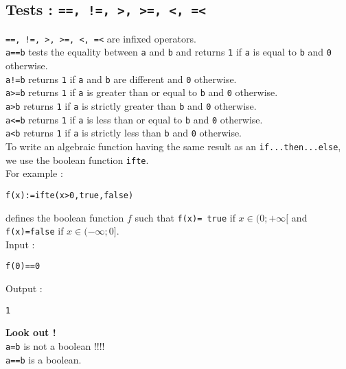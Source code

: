 \documentclass[a4paper,11pt]{book}
\begin{document}
\subsection{Tests : {\tt ==, !=, >, >=, <, =<}}\index{==}\index{>}\index{<}\index{>=}\index{<=}
{\tt ==, !=, >, >=, <, =<} are infixed operators.\\
{\tt a==b} tests the equality between {\tt a} and {\tt b} and returns {\tt 1} 
if {\tt a} is equal to {\tt b} and {\tt 0} otherwise.\\ 
{\tt a!=b} returns {\tt 1} if {\tt a} and {\tt b} are different and {\tt 0} 
otherwise.\\
 {\tt a>=b} returns {\tt 1} if {\tt a} is greater than or equal to {\tt b} 
and {\tt 0} otherwise.\\ 
{\tt a>b} returns {\tt 1} if {\tt a} is strictly greater than {\tt b}
and {\tt 0} otherwise.\\ 
{\tt a<=b} returns {\tt 1} if {\tt a} is less than or equal to {\tt b} and 
{\tt 0} otherwise.\\
{\tt a<b} returns {\tt 1} if {\tt a} is strictly less than {\tt b} 
and {\tt 0} otherwise.\\ 
To write an algebraic function having the same result as an 
{\tt if...then...else}, we use the boolean function {\tt ifte}.\\
For example :  
\begin{center}{\tt f(x):=ifte(x>0,true,false)}\end{center}
defines the boolean function $f$ such that {\tt f(x)= true} if 
$x \in (0;+\infty[$ and {\tt f(x)=false} if $x \in (-\infty;0]$.\\
Input :
\begin{center}{\tt f(0)==0}\end{center}
Output :
\begin{center}{\tt 1}\end{center}
{\bf Look out !}\\
{\tt a=b}  is not a boolean !!!!\\
{\tt a==b} is a boolean.\\
\end{document}
